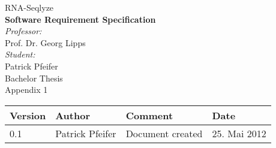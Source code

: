 \begin{titlepage}
\thispagestyle{plain}
\begin{center}
%
{ \sffamily\Huge RNA-Seqlyze }
\\[1cm]
{ \sffamily\LARGE \bfseries Software Requirement Specification }
\\[2cm]
%
\large\emph{Professor:}\\
	Prof. Dr. Georg Lipps
\\[1cm]
\large\emph{Student:}\\
	Patrick Pfeifer
%
\\[2cm]
{ \LARGE Bachelor Thesis }\\[0.5cm]
{ \Large Appendix 1 }
%
\\\vfill
%
\listoftodos\vfill
%
\setlength{\aboverulesep}{0pt}
\setlength{\belowrulesep}{0pt}
\setlength{\extrarowheight}{.75ex}
\begin{tabularx}{\textwidth}{|p{1.6cm}|>{\raggedright}p{3cm}|X|p{3cm}|}
\midrule
\rowcolor[gray]{0.8}
	Version & Author & Comment & Date
\\\midrule
	  0.1
	& Patrick Pfeifer
	& Document created
	& 25. Mai 2012
\\\midrule
\end{tabularx}
\end{center}
\end{titlepage}
